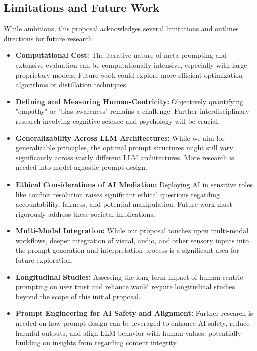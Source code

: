 \documentclass{article}
\begin{document}
\subsection{Limitations and Future Work}
While ambitious, this proposal acknowledges several limitations and outlines directions for future research:
\begin{itemize}
    \item \textbf{Computational Cost:} The iterative nature of meta-prompting and extensive evaluation can be computationally intensive, especially with large proprietary models. Future work could explore more efficient optimization algorithms or distillation techniques.
    \item \textbf{Defining and Measuring Human-Centricity:} Objectively quantifying "empathy" or "bias awareness" remains a challenge. Further interdisciplinary research involving cognitive science and psychology will be crucial.
    \item \textbf{Generalizability Across LLM Architectures:} While we aim for generalizable principles, the optimal prompt structures might still vary significantly across vastly different LLM architectures. More research is needed into model-agnostic prompt design.
    \item \textbf{Ethical Considerations of AI Mediation:} Deploying AI in sensitive roles like conflict resolution raises significant ethical questions regarding accountability, fairness, and potential manipulation. Future work must rigorously address these societal implications.
    \item \textbf{Multi-Modal Integration:} While our proposal touches upon multi-modal workflows, deeper integration of visual, audio, and other sensory inputs into the prompt generation and interpretation process is a significant area for future exploration.
    \item \textbf{Longitudinal Studies:} Assessing the long-term impact of human-centric prompting on user trust and reliance would require longitudinal studies beyond the scope of this initial proposal.
    \item \textbf{Prompt Engineering for AI Safety and Alignment:} Further research is needed on how prompt design can be leveraged to enhance AI safety, reduce harmful outputs, and align LLM behavior with human values, potentially building on insights from \cite{PaperThree} regarding content integrity.
\end{itemize}
\end{document}
